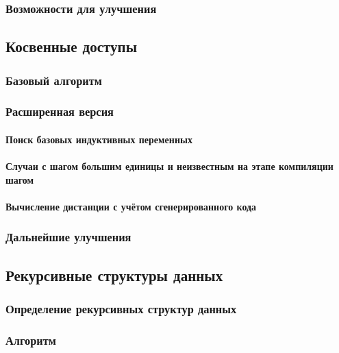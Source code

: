 \documentclass[12pt,a4paper]{article}
\begin{document}
\subsubsection{Возможности для улучшения}

\subsection{Косвенные доступы}

\subsubsection{Базовый алгоритм}

\subsubsection{Расширенная версия}

\paragraph{Поиск базовых индуктивных переменных}

\paragraph{Случаи с шагом большим единицы и неизвестным на этапе компиляции шагом}

\paragraph{Вычисление дистанции с учётом сгенерированного кода}

\subsubsection{Дальнейшие улучшения}

\subsection{Рекурсивные структуры данных}

\subsubsection{Определение рекурсивных структур данных}

\subsubsection{Алгоритм}
\end{document}
